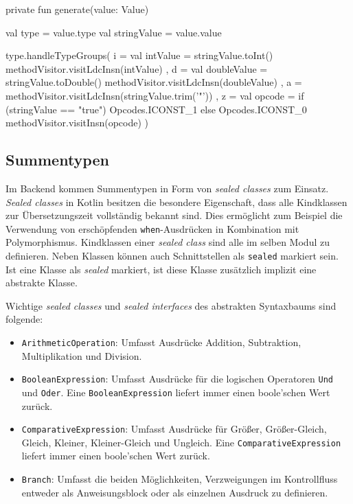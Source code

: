 \begin{KotlinCode}[numbers=none, caption={\texttt{generate()} Funktion, welche Wert-Literale erzeugt.}, label=lst:impl_generateexample]
private fun generate(value: Value) {
    val type = value.type
    val stringValue = value.value

    type.handleTypeGroups(
        i = {
            val intValue = stringValue.toInt()
            methodVisitor.visitLdcInsn(intValue)
        },
        d = {
            val doubleValue = stringValue.toDouble()
            methodVisitor.visitLdcInsn(doubleValue)
        },
        a = { methodVisitor.visitLdcInsn(stringValue.trim('"')) },
        z = {
            val opcode = if (stringValue == "true") Opcodes.ICONST_1 else Opcodes.ICONST_0
            methodVisitor.visitInsn(opcode)
        }
    )
}
\end{KotlinCode}

\subsection{Summentypen}

Im Backend kommen Summentypen in Form von \textit{sealed classes} zum Einsatz. \textit{Sealed classes} in Kotlin besitzen die besondere Eigenschaft, dass alle Kindklassen zur Übersetzungszeit vollständig bekannt sind. Dies ermöglicht zum Beispiel die Verwendung von erschöpfenden \texttt{when}-Ausdrücken in Kombination mit Polymorphismus. Kindklassen einer \textit{sealed class} sind alle im selben Modul zu definieren. Neben Klassen können auch Schnittstellen als \texttt{sealed} markiert sein. Ist eine Klasse als \textit{sealed} markiert, ist diese Klasse zusätzlich implizit eine abstrakte Klasse.

Wichtige \textit{sealed classes} und \textit{sealed interfaces} des abstrakten Syntaxbaums sind folgende:

\begin{itemize}
    \item \texttt{ArithmeticOperation}: Umfasst Ausdrücke Addition, Subtraktion, Multiplikation und Division.
    \item \texttt{BooleanExpression}: Umfasst Ausdrücke für die logischen Operatoren \texttt{Und} und \texttt{Oder}. Eine \texttt{BooleanExpression} liefert immer einen boole'schen Wert zurück.
    \item \texttt{ComparativeExpression}: Umfasst Ausdrücke für Größer, Größer-Gleich, Gleich, Kleiner, Kleiner-Gleich und Ungleich. Eine \texttt{ComparativeExpression} liefert immer einen boole'schen Wert zurück.
    \item \texttt{Branch}: Umfasst die beiden Möglichkeiten, Verzweigungen im Kontrollfluss entweder als Anweisungsblock oder als einzelnen Ausdruck zu definieren.
\end{itemize}

